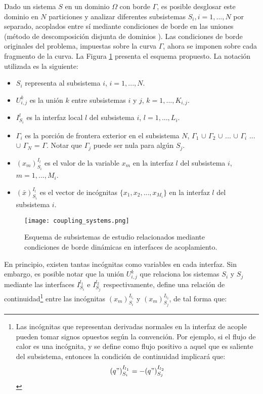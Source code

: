 Dado un sistema $S$ en un dominio $\Omega$ con borde $\Gamma$, es posible desglosar este dominio en $N$ particiones 
y analizar diferentes subsistemas $S_i,i=1,...,N$ por separado, acoplados entre sí mediante condiciones de borde en las uniones
(método de descomposición disjunta de dominios \cite{ddmethod}).
Las condiciones de borde originales del problema, impuestas sobre la curva $\Gamma$,
ahora se imponen sobre cada fragmento de la curva.
La Figura \ref{esquema-acoplamiento} presenta el esquema propuesto.
La notación utilizada es la siguiente:
\begin{itemize}
\item $S_i$ representa al subsistema $i$, $i=1,...,N$.
\item $U_{i,j}^k$ es la unión $k$ entre subsistemas $i$ y $j$, $k=1,...,K_{i,j}$.
\item $I_{S_i}^{l}$ es la interfaz local $l$ del subsistema $i$, $l=1,...,L_i$.
\item $\Gamma_i$ es la porción de frontera exterior en el subsistema $N$,
 $\Gamma_1$ $\cup$ $\Gamma_2$ $\cup$ ... $\cup$ $\Gamma_i$ ...  $\cup$ $\Gamma_N$ = $\Gamma$.
 Notar que $\Gamma_j$ puede ser nula para algún $S_j$.
\item ${(x_m)_{S_i}^{I_l}}$ es el valor de la variable $x_m$ en la interfaz ${l}$ del subsistema ${i}$, $m=1,...,M_i$.
\item ${(\bar{x})_{S_i}^{I_l}}$ es el vector de incógnitas $\{x_1,x_2,...,x_{M_i}\}$ en la interfaz ${l}$ del subsistema ${i}$.
\end{itemize}

\begin{figure}[ht]
\centering{}\texttt{[image: coupling\_systems.png]}
\caption[Esquema de descomposición disjunta de dominios]{Esquema de subsistemas de estudio relacionados mediante condiciones de borde dinámicas en interfaces de acoplamiento.} 
\label{esquema-acoplamiento} 
\end{figure}

En principio, existen tantas incógnitas como variables en cada interfaz.
Sin embargo, es posible notar que la unión $U_{i,j}^k$ que relaciona los sistemas $S_{i}$ y $S_{j}$ 
mediante las interfaces $I_{S_{i}}^{l_1}$ e $I_{S_{j}}^{l_2}$ respectivamente, 
define una relación de continuidad\footnote{
Las incógnitas que representan derivadas normales en la interfaz de acople pueden tomar signos opuestos según la convención.
Por ejemplo, si el flujo de calor es una incógnita, 
y se define como flujo positivo a aquel que es saliente del subsistema, 
entonces la condición de continuidad implicará que:
\begin{equation*}
{(q")_{S_i}^{I_{l_1}}}=-{(q")_{S_j}^{I_{l_2}}}
\label{continuidad-q}
\end{equation*}
} entre las incógnitas ${(x_m)_{S_i}^{I_{l_1}}}$ y ${(x_m)_{S_j}^{I_{l_2}}}$, de tal forma que:

